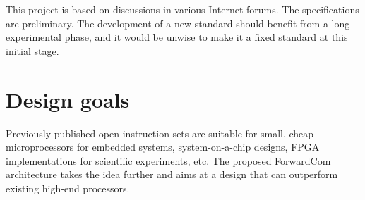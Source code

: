\documentclass[forwardcom.tex]{subfiles}
\begin{document}
This project is based on discussions in various Internet forums. The specifications are preliminary. The development of a new standard should benefit from a long experimental phase, and it would be unwise to make it a fixed standard at this initial stage.


\section{Design goals}
Previously published open instruction sets are suitable for small, cheap microprocessors for embedded systems, system-on-a-chip designs, FPGA implementations for scientific experiments, etc. The proposed ForwardCom architecture takes the idea further and aims at a design that can outperform existing high-end processors.
\vspace{2mm}
\end{document}
